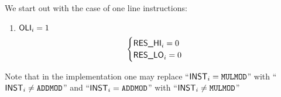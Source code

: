We start out with the case of one line instructions:
\begin{enumerate}
	\item \If $\textsf{OLI}_{i} = 1$ \Then
		\[
			\begin{cases}
				\textsf{RES}\textsf{\_HI}_{i} = 0 \\
				\textsf{RES}\textsf{\_LO}_{i} = 0 \\
			\end{cases}
		\]
\end{enumerate}
Note that in the implementation one may replace
``\If $\textsf{INST}_{i} = \texttt{MULMOD}$'' with ``\If $\textsf{INST}_{i} \neq \texttt{ADDMOD}$'' and
``\If $\textsf{INST}_{i} = \texttt{ADDMOD}$'' with ``\If $\textsf{INST}_{i} \neq \texttt{MULMOD}$''
